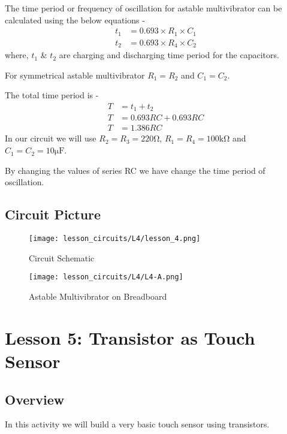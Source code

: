 The time period or frequency of oscillation for astable multivibrator can be calculated using the below equations - 
\begin{align*}
    t_1 &= 0.693 \times R_1 \times C_1 \\
    t_2 &= 0.693 \times R_4 \times C_2
\end{align*}
where, $t_1$ \& $t_2$ are charging and discharging time period for the capacitors.

For symmetrical astable multivibrator $R_1 = R_2$ and $C_1 = C_2$.

The total time period is -
\begin{align*}
    T &= t_1 + t_2 \\
    T &= 0.693RC + 0.693RC \\
    T &= 1.386RC
\end{align*}
In our circuit we will use $R_2 = R_3 = 220\si{\ohm}$, $R_1 = R_4 = 100\si{\kilo\ohm}$ and $C_1 = C_2 = 10\si{\micro\farad}$.

By changing the values of series RC we have change the time period of oscillation.
\subsection{Circuit Picture}
\begin{figure}[htp]
    \centering
    \texttt{[image: lesson\_circuits/L4/lesson\_4.png]}
    \caption{Circuit Schematic}
    \label{fig:asm_sch}
\end{figure}
\begin{figure}[htp]
    \centering
    \texttt{[image: lesson\_circuits/L4/L4-A.png]}
    \caption{Astable Multivibrator on Breadboard}
    \label{fig:asm_obb}
\end{figure}



\section{Lesson 5: Transistor as Touch Sensor}
\subsection{Overview}
In this activity we will build a very basic touch sensor using transistors.
